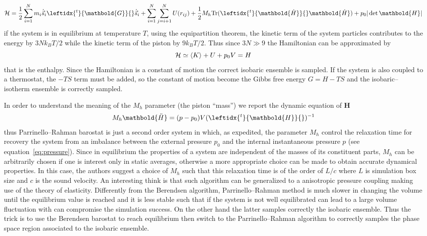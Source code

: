 \begin{equation*}
	\mathcal{H} = \frac{1}{2}\sum_{i=1}^N m_i \dot{\vec s}_i \leftidx{^t}{\mathbold{G}}{} \dot{\vec s}_i + \sum_{i=1}^N \sum_{j=i+1}^N U(r_{ij}) +  \frac{1}{2} M_h \text{Tr}( \leftidx{^t}{\mathbold{\dot H}}{} \mathbold{\dot H} ) +  p_0 |\det\mathbold{H}|
\end{equation*}
if the system is in equilibrium at temperature $T$, using the equipartition theorem, the kinetic term of the system particles contributes to the energy by $3Nk_BT/2$ while the kinetic term of the piston by $9k_BT/2$. Thus since $3N \gg 9$ the Hamiltonian can be approximated by
\begin{equation*}
	\mathcal{H} \simeq \left \langle K \right \rangle + U + p_0 V = H
\end{equation*}
that is the enthalpy. Since the Hamiltonian is a constant of motion the correct isobaric ensemble is sampled. If the system is also coupled to a thermostat, the $-TS$ term must be added, so the constant of motion become the Gibbs free energy $G = H - TS$ and the isobaric--isotherm ensemble is correctly sampled.

In order to understand the meaning of the $M_h$ parameter (the piston ``mass'') we report the dynamic equation of $\mathbold H$
\begin{equation*}
	M_h \mathbold{\ddot H} =  (p - p_0) V (\leftidx{^t}{\mathbold{H}}{})^{-1}
\end{equation*}
thus Parrinello--Rahman barostat is just a second order system in which, as expedited, the parameter $M_h$ control the relaxation time for recovery the system from an imbalance between the external pressure $p_0$ and the internal instantaneous pressure $p$ (see equation~\eqref{eq:pressure}). Since in equilibrium the properties of a system are independent of the masses of its constituent parts, $M_h$ can be arbitrarily chosen if one is interest only in static averages, otherwise a more appropriate choice can be made to obtain accurate dynamical properties. In this case, the authors suggest a choice of $M_h$ such that this relaxation time is of the order of $L/c$ where $L$ is simulation box size and $c$ is the sound velocity. An interesting think is that such algorithm can be generalized to a anisotropic pressure coupling making use of the theory of elasticity. Differently from the Berendsen algorithm, Parrinello--Rahman method is much slower in changing the volume until the equilibrium value is reached and it is less stable such that if the system is not well equilibrated can lead to a large volume fluctuation with can compromise the simulation success. On the other hand the latter samples correctly the isobaric ensemble. Thus the trick is to use the Berendsen barostat to reach equilibrium then switch to the Parrinello--Rahman algorithm to correctly samples the phase space region associated to the isobaric ensemble.

